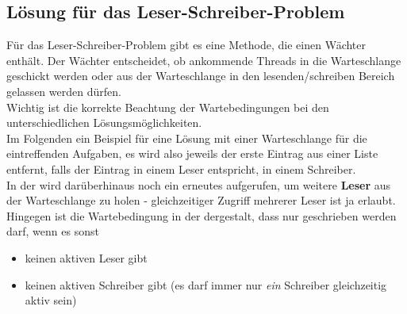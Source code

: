 \subsection*{Lösung für das Leser-Schreiber-Problem}

Für das Leser-Schreiber-Problem gibt es eine Methode, die einen Wächter enthält.
Der Wächter entscheidet, ob ankommende Threads in die Warteschlange geschickt werden oder aus der Warteschlange in den lesenden/schreiben Bereich gelassen werden dürfen.\\

\noindent
Wichtig ist die korrekte Beachtung der Wartebedingungen bei den unterschiedlichen Lösungsmöglichkeiten.\\

\noindent
Im Folgenden ein Beispiel für eine Lösung mit einer Warteschlange für die eintreffenden Aufgaben, es wird also jeweils der erste Eintrag aus einer Liste entfernt, falls der Eintrag in  einem Leser entspricht, in  einem Schreiber.\\
In der  wird darüberhinaus noch ein erneutes  aufgerufen, um weitere \textbf{Leser} aus der Warteschlange zu holen - gleichzeitiger Zugriff mehrerer Leser ist ja erlaubt.\\
Hingegen ist die Wartebedingung in der  dergestalt, dass nur geschrieben werden darf, wenn es sonst
\begin{itemize}
    \item keinen aktiven Leser gibt
    \item keinen aktiven Schreiber gibt (es darf immer nur \textit{ein} Schreiber gleichzeitig aktiv sein)
\end{itemize}



